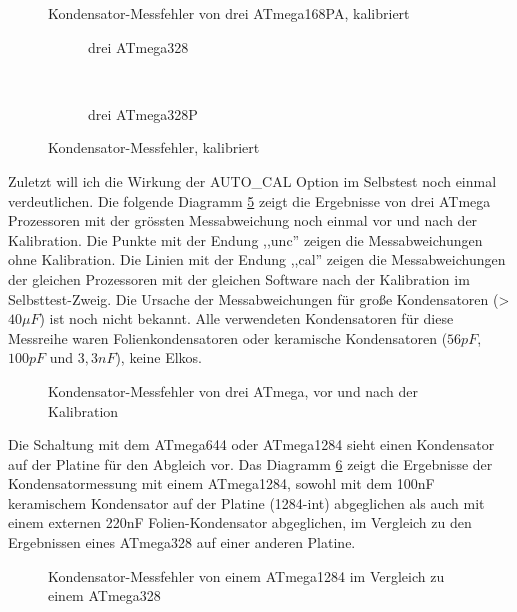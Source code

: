 \begin{figure}[H]
\centering

\caption{Kondensator-Messfehler von drei ATmega168PA, kalibriert}
\label{fig:mega168PAcal}
\end{figure}

\begin{figure}[H]
  \begin{subfigure}[b]{9cm}
    \centering
    \resizebox{9cm}{!}{}
    \caption{drei ATmega328}
    \label{fig:mega328cal}
  \end{subfigure}
  ~
  \begin{subfigure}[b]{9cm}
    \centering
    \resizebox{9cm}{!}{}
    \caption{drei ATmega328P}
    \label{fig:mega328Pcal}
  \end{subfigure}
  \caption{Kondensator-Messfehler, kalibriert}
\end{figure}

Zuletzt will ich die Wirkung der AUTO\_CAL Option im Selbstest noch einmal verdeutlichen.
Die folgende Diagramm \ref{fig:MegaAuto} zeigt die Ergebnisse von drei ATmega Prozessoren 
mit der grössten Messabweichung noch einmal vor und nach der Kalibration.
Die Punkte mit der Endung ,,unc'' zeigen die Messabweichungen ohne Kalibration.
Die Linien mit der Endung ,,cal'' zeigen die Messabweichungen der gleichen Prozessoren
mit der gleichen Software nach der Kalibration im Selbsttest-Zweig.
Die Ursache der Messabweichungen für große Kondensatoren (\textgreater\(40 \mu F\)) ist
noch nicht bekannt. Alle verwendeten Kondensatoren für diese Messreihe waren
Folienkondensatoren oder keramische Kondensatoren (\(56 pF\), \(100 pF\) und \(3,3 nF\)), keine Elkos.

\begin{figure}[H]
\centering

\caption{Kondensator-Messfehler von drei ATmega, vor und nach der Kalibration}
\label{fig:MegaAuto}
\end{figure}

Die Schaltung mit dem ATmega644 oder ATmega1284 sieht einen Kondensator auf der Platine für den Abgleich
vor. Das Diagramm \ref{fig:Mega1284} zeigt die Ergebnisse der Kondensatormessung mit einem ATmega1284,
sowohl mit dem 100nF keramischem Kondensator auf der Platine (1284-int) abgeglichen als auch mit
einem externen 220nF Folien-Kondensator abgeglichen, im Vergleich zu den Ergebnissen eines ATmega328 auf einer
anderen Platine.

\begin{figure}[H]
\centering

\caption{Kondensator-Messfehler von einem ATmega1284 im Vergleich zu einem ATmega328}
\label{fig:Mega1284}
\end{figure}
